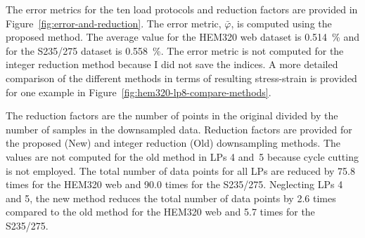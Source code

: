 \documentclass[a4paper,11pt]{article}
\begin{document}
The error metrics for the ten load protocols and reduction factors are provided in Figure~\ref{fig:error-and-reduction}.
The error metric, $\bar{\varphi}$, is computed using the proposed method.
The average value for the HEM320 web dataset is 0.514~\% and for the S235/275 dataset is 0.558~\%.
The error metric is not computed for the integer reduction method because I did not save the indices.
A more detailed comparison of the different methods in terms of resulting stress-strain is provided for one example in Figure~\ref{fig:hem320-lp8-compare-methods}.

The reduction factors are the number of points in the original divided by the number of samples in the downsampled data.
Reduction factors are provided for the proposed (New) and integer reduction (Old) downsampling methods.
The values are not computed for the old method in LPs 4 and~5 because cycle cutting is not employed.
The total number of data points for all LPs are reduced by 75.8 times for the HEM320 web and 90.0 times for the S235/275.
Neglecting LPs 4 and 5, the new method reduces the total number of data points by 2.6 times compared to the old method for the HEM320 web and 5.7 times for the S235/275.
\end{document}
